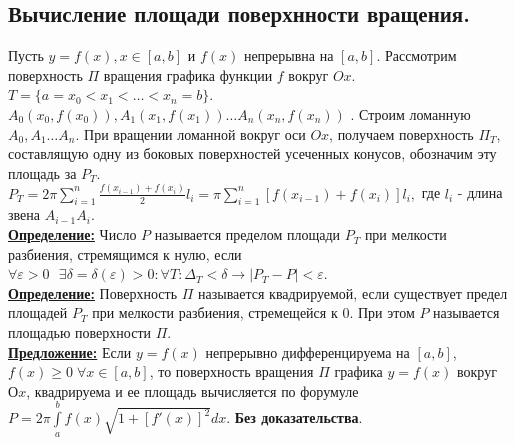 \documentclass[a4paper,12pt]{article} %
\renewcommand {\geq}{\geqslant}
\begin{document}
\subsection{Вычисление площади поверхнности вращения.}
Пусть $y = f(x), x \in [a, b]$ и $f(x)$ непрерывна на $[a, b]$.
Рассмотрим поверхность $\Pi$ вращения графика функции $f$ вокруг $Ox$. $T = \{ a = x_0 < x_1<\dots<x_n = b \}$.
$A_0 (x_0, f(x_0)), A_1 (x_1, f(x_1)) \dots A_n(x_n, f(x_n))$ .
Строим ломанную $A_0, A_1\dots A_n$. При вращении ломанной вокруг оси $Ox$, получаем поверхность $\Pi_T$, составлящую одну из боковых поверхностей усеченных конусов, обозначим эту площадь за $P_T$.
$P_T=2\pi \sum\limits_{i=1}^n \frac{f(x_{i-1})+f(x_i)}{2}l_i=\pi \sum\limits_{i=1}^n [f(x_{i-1})+f(x_i)]l_i,$ где $l_i$ - длина звена $A_{i-1}A_i$.\\
\underline{\textbf{Определение:}} Число $P$ называется пределом площади $P_T$ при мелкости разбиения, стремящимся к нулю, если $\forall \varepsilon > 0 \text{ }\exists \delta=\delta(\varepsilon) > 0 : \forall T: \Delta_T<\delta \rightarrow |P_T-P|<\varepsilon$.\\
\underline{\textbf{Определение:}}  Поверхность $\Pi$ называется квадрируемой, если существует предел площадей $P_T$ при мелкости разбиения,  стремещейся к 0. При этом $P$ называется площадью поверхности $\Pi$.\\
\underline{\textbf{Предложение:}} Если $y=f(x)$ непрерывно дифференцируема на $[a, b]$, $f(x) \geq 0\; \forall x\in[a,b]$, то поверхность вращения $\Pi$ графика $y=f(x)$ вокруг $Оx$, квадрируема и ее площадь вычисляется по форумуле $P=2\pi \int\limits_a^b f(x) \sqrt{1+[f'(x)]^2}dx$.
\textbf{Без доказательства}.\\
\end{document}
